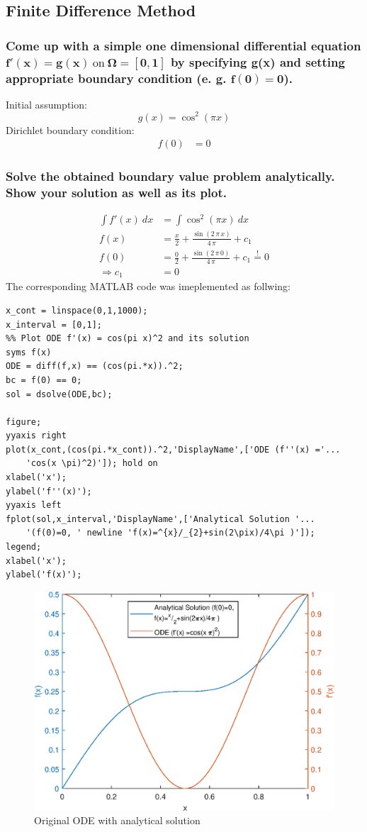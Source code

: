 \subsection{Finite Difference Method}
\subsubsection{Come up with a simple one dimensional differential equation \\$\mathbf{f'(x)=g(x)\ \mathrm{on}\ \Omega=[0,1]}$ by specifying g(x) and setting appropriate boundary condition (e. g. $\mathbf{f(0) = 0}$).}
Initial assumption:
\begin{equation}
    g(x) = \cos^2(\pi x)
\end{equation}
Dirichlet boundary condition:
\begin{align}
    f(0) &= 0 \label{eq:bcs}
\end{align}

\subsubsection{Solve the obtained boundary value problem analytically. Show your solution as well
as its plot.}
\begin{align}
   \int{f'(x)\ dx} &= \int{\cos^2(\pi x)\ dx}\\
  f(x) &= \frac{x}{2}+\frac{\sin\left(2\,\pi \,x\right)}{4\,\pi } + c_1\\
  f(0) &= \frac{0}{2}+\frac{\sin\left(2\,\pi \,0\right)}{4\,\pi } + c_1 \overset{!}{=} 0\\
  \Rightarrow c_1 &= 0
\end{align}
\clearpage
The corresponding MATLAB code was imeplemented as follwing:
\begin{lstlisting}
x_cont = linspace(0,1,1000);
x_interval = [0,1];
%% Plot ODE f'(x) = cos(pi x)^2 and its solution
syms f(x)
ODE = diff(f,x) == (cos(pi.*x)).^2;
bc = f(0) == 0;
sol = dsolve(ODE,bc);

figure;
yyaxis right
plot(x_cont,(cos(pi.*x_cont)).^2,'DisplayName',['ODE (f''(x) ='...
    'cos(x \pi)^2)']); hold on
xlabel('x');
ylabel('f''(x)');
yyaxis left
fplot(sol,x_interval,'DisplayName',['Analytical Solution '...
    '(f(0)=0, ' newline 'f(x)=^{x}/_{2}+sin(2\pix)/4\pi )']);
legend;
xlabel('x');
ylabel('f(x)');
\end{lstlisting}
\begin{figure}[htb!]
    \centering
    \includegraphics[width=.7\linewidth]{./homework2/img/1.eps}
    \caption{Original ODE with analytical solution}
    \label{fig:ana_sol}
\end{figure}
